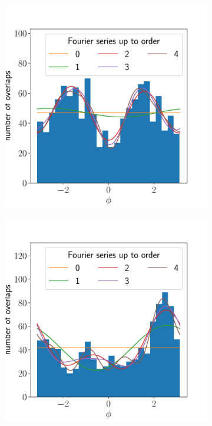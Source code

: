 \documentclass{article}
\begin{document}
\begin{figure}[ht]
\begin{subfigure}{0.24\linewidth}
		\caption{}
		\label{fig:isotropyhistvectra1all}
	\end{subfigure}
	\begin{subfigure}{0.24\linewidth}
		\includegraphics[width=\linewidth]{isotropy-histogram-JHUVectra-4-edges}
		\caption{}
		\label{fig:isotropyhistvectra4edges}
	\end{subfigure}
	\begin{subfigure}{0.24\linewidth}
		\includegraphics[width=\linewidth]{isotropy-histogram-JHUVectra-3-edges}

\end{subfigure}
\end{figure}
\end{document}
